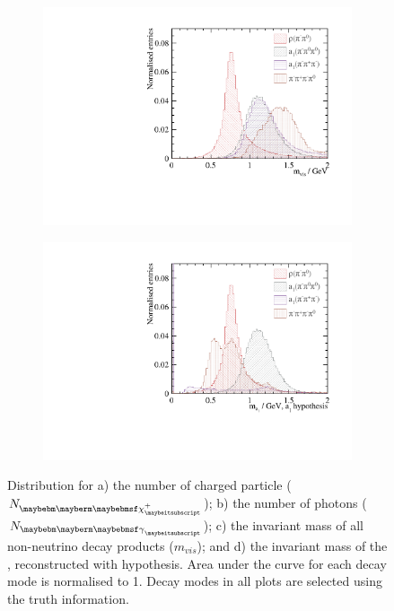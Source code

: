 \begin{figure}[htbp]
\begin{subfigure}[b]{0.45\textwidth}
  \caption{}
  \label{fig:tauVarNPhoton}
\end{subfigure}
\begin{subfigure}[b]{0.45\textwidth}
 \includegraphics[width=\textwidth]{tau/var2/mVis_100GeV_improved_zoom.pdf}
  \caption{}
  \label{fig:tauVarMVis}
\end{subfigure}
\begin{subfigure}[b]{0.45\textwidth}
 \includegraphics[width=\textwidth]{tau/var2/mA1A1Fit_100GeV_improved_zoom.pdf}
  \caption{}
  \label{fig:tauVarMA1}
\end{subfigure}

\caption
{Distribution for a) the number of charged particle (${N}_{\charge}$); b) the number of photons (${N}_{\Pgg}$); c) the invariant mass of all non-neutrino decay products ($m_{vis}$); and d) the invariant mass of the \Pai, reconstructed with \decayAiPhotonShort hypothesis. Area under the curve for each decay mode is normalised to 1. Decay modes in all plots are selected using the truth information.}
\label{fig:tauVar}
\end{figure}

